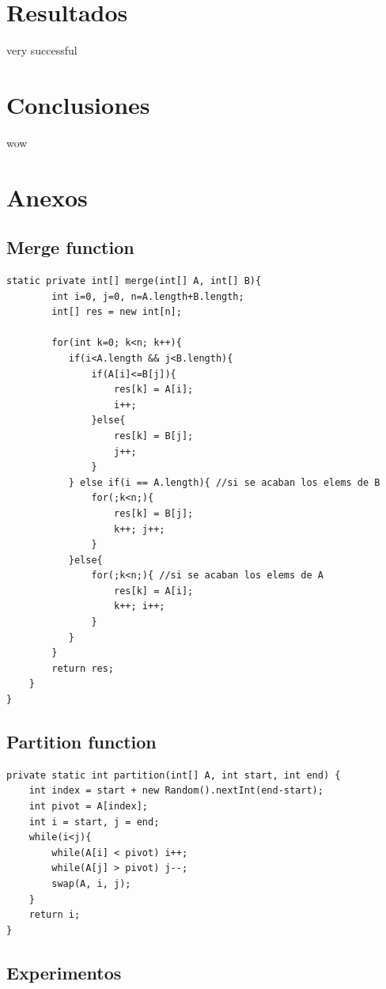 \documentclass[12pt,letterpaper, margin = 3cm]{article}
\begin{document}
\newpage
\section{Resultados}
very successful

\newpage
\section{Conclusiones}
wow




\newpage
\section{Anexos}

\subsection{Merge function}
\begin{lstlisting}
static private int[] merge(int[] A, int[] B){
        int i=0, j=0, n=A.length+B.length;
        int[] res = new int[n];

        for(int k=0; k<n; k++){
           if(i<A.length && j<B.length){
               if(A[i]<=B[j]){
                   res[k] = A[i];
                   i++;
               }else{
                   res[k] = B[j];
                   j++;
               }
           } else if(i == A.length){ //si se acaban los elems de B
               for(;k<n;){
                   res[k] = B[j];
                   k++; j++;
               }
           }else{
               for(;k<n;){ //si se acaban los elems de A
                   res[k] = A[i];
                   k++; i++;
               }
           }
        }
        return res;
    }
}
\end{lstlisting}
\newpage
\subsection{Partition function}
\begin{lstlisting}
private static int partition(int[] A, int start, int end) {
    int index = start + new Random().nextInt(end-start);
    int pivot = A[index];
    int i = start, j = end;
    while(i<j){
        while(A[i] < pivot) i++;
        while(A[j] > pivot) j--;
        swap(A, i, j);
    }
    return i;
}
\end{lstlisting}

\subsection{Experimentos}
\end{document}
